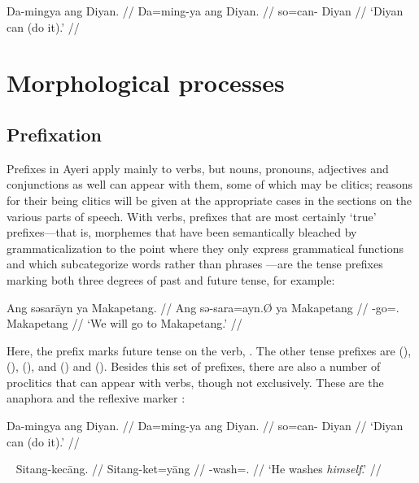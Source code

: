 \ex\begingl
	\gla Da-mingya ang Diyan. //
	\glb Da=ming-ya ang Diyan. //
	\glc so=can-\TsgM{} \Aarg{} Diyan //
	\glft `Diyan can (do it).' //
\endgl\xe

\section{Morphological processes}

\subsection{Prefixation}

Prefixes in Ayeri apply mainly to verbs, but nouns, pronouns, adjectives and
conjunctions as well can appear with them, some of which may be clitics;
reasons for their being clitics will be given at the appropriate cases in the
sections on the various parts of speech. With verbs, prefixes that are most
certainly `true' prefixes---that is, morphemes that have been semantically
bleached by grammaticalization to the point where they only express grammatical
functions \citep[157ff.]{lehmann2015} and which subcategorize words rather than
phrases \citep[117]{klavans1985}---are the tense prefixes marking both three
degrees of past and future tense, for example:

\ex\begingl
	\gla Ang səsarāyn ya Makapetang. //
	\glb Ang sə-sara=ayn.Ø ya Makapetang //
	\glc \AgtT{} \Fut{}-go=\Fpl{}.\Top{} \Loc{} Makapetang //
	\glft `We will go to Makapetang.' //
\endgl\xe

Here, the prefix  marks future tense on the verb, 
. The other tense prefixes are  
(\NPst{}),  (\Pst{}),  (\RPst{}), and 
 (\NFut{}) and  (\RFut{}). Besides this set of 
prefixes, there are also a number of proclitics that can appear with verbs, 
though not exclusively. These are the anaphora  
and the reflexive marker :
 
\ex\begingl
	\gla Da-mingya ang Diyan. //
	\glb Da=ming-ya ang Diyan. //
	\glc so=can-\TsgM{} \Aarg{} Diyan //
	\glft `Diyan can (do it).' //
\endgl
% 
\xe

\ex~\begingl
	\gla Sitang-kecāng. //
	\glb Sitang-ket=yāng //
	\glc \Refl{}-wash=\TsgM{}.\Aarg{} //
	\glft `He washes \emph{himself}.' //
\endgl\xe

